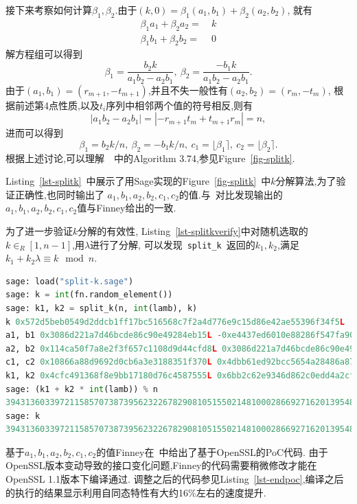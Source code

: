 \documentclass{article}
\newcommand{\code}[1]{\lstinline!#1!}
\begin{document}
接下来考察如何计算$\beta_1, \beta_2$.由于$(k, 0) = \beta_1(a_1,b_1) + \beta_2(a_2, b_2)$, 就有
\begin{equation}\nonumber
\begin{split}
\beta_1a_1 + \beta_2a_2 =& \  k\\
\beta_1b_1 + \beta_2b_2 =& \ 0
\end{split}
\end{equation}
解方程组可以得到
$$\beta_1 = \dfrac{b_2k}{a_1b_2 - a_2b_1}, \ \beta_2 = \dfrac{-b_1k}{a_1b_2-a_2b_1}.$$
由于$(a_1, b_1) = (r_{m+1}, - t_{m+1})$,并且不失一般性有$(a_2, b_2) = (r_{m}, - t_{m})$, 
根据前述第4点性质,以及$t_i$序列中相邻两个值的符号相反,则有
$$|a_1b_2-a_2b_1| = |-r_{m+1}t_{m}+ t_{m+1}r_{m}| = n,$$
进而可以得到
$$\beta_1 = b_2k / n, \ \beta_2 = -b_1k/n, \ c_1 = \lfloor \beta_1 \rceil, \  c_2 = \lfloor \beta_2 \rceil.$$
根据上述讨论,可以理解~\cite{guidetoecc}~中的Algorithm 3.74,参见Figure~\ref{fig-splitk}.

Listing~\ref{lst-splitk}~中展示了用Sage实现的Figure~\ref{fig-splitk}~中$k$分解算法,为了验证正确性,也同时输出了
$a_1, b_1, a_2, b_2, c_1, c_2$的值.与~\cite{halfinney}对比发现输出的$a_1, b_1, a_2, b_2, c_1, c_2$值与Finney给出的一致.



为了进一步验证$k$分解的有效性, Listing~\ref{lst-splitkverify}中对随机选取的$k\in_R[1,n-1]$,用$\lambda$进行了分解,
可以发现~\code{split_k}~返回的$k_1, k_2$,满足$k_1 + k_2\lambda\equiv k\mod n$.
\begin{lstlisting}[language=python, caption=\texttt{verify multiplier split  with $\lambda$ for secp256k1}, label=lst-splitkverify]
sage: load("split-k.sage")
sage: k = int(fn.random_element())
sage: k1, k2 = split_k(n, int(lamb), k)
k 0x572d5beb0549d2ddcb1ff17bc516568c7f2a4d776e9c15d86e42ae55396f34f5L
a1, b1 0x3086d221a7d46bcde86c90e49284eb15L -0xe4437ed6010e88286f547fa90abfe4c3L
a2, b2 0x114ca50f7a8e2f3f657c1108d9d44cfd8L 0x3086d221a7d46bcde86c90e49284eb15L
c1, c2 0x10866a88d9692d0cb6a3e3188351f370L 0x4dbb61ed92bcc5654a28486a8793676aL
k1, k2 0x4cfc491368f8e9bb17180d76c4587555L 0x6bb2c62e9346d862c0edd4a2cf1e649eL
sage: (k1 + k2 * int(lamb)) % n
39431360339721158570738739562322678290810515502148100028669271620139548095733
sage: k
39431360339721158570738739562322678290810515502148100028669271620139548095733L
\end{lstlisting}

基于$a_1, b_1, a_2, b_2, c_1, c_2$的值Finney在~\cite{halfinney}中给出了基于OpenSSL的PoC代码.
由于OpenSSL版本变动导致的接口变化问题,Finney的代码需要稍微修改才能在OpenSSL 1.1版本下编译通过.
调整之后的代码参见Listing~\ref{lst-endpoc},编译之后的执行的结果显示利用自同态特性有大约16\%左右的速度提升.
\end{document}
